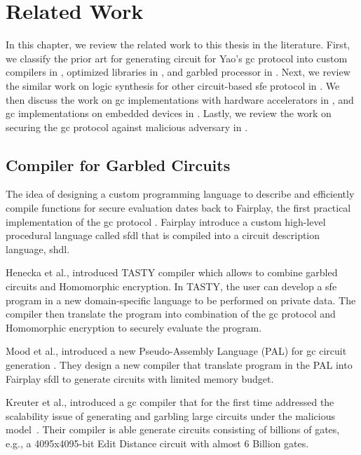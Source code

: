 \chapter{Related Work}\label{chap:related}
In this chapter, we review the related work to this thesis in the literature.
First, we classify the prior art for generating circuit for Yao's \acrfull{gc} protocol into custom compilers in , optimized libraries in , and garbled processor in .
Next, we review the similar work on logic synthesis for other circuit-based \acrshort{sfe} protocol in .
We then discuss the work on \acrshort{gc} implementations with hardware accelerators in , and \acrshort{gc} implementations on embedded devices in .
Lastly, we review the work on securing the \acrshort{gc} protocol against malicious adversary in .

\section{Compiler for Garbled Circuits}\label{sec:related-compiler}
The idea of designing a custom programming language to describe and efficiently compile functions for secure evaluation dates back to Fairplay, the first practical implementation of the \acrshort{gc} protocol \cite{malkhi2004fairplay}.
Fairplay introduce a custom high-level procedural language called \acrfull{sfdl} that is compiled into a circuit description language, \acrfull{shdl}.

Henecka et al., introduced TASTY compiler \cite{henecka2010tasty} which allows to combine garbled circuits and Homomorphic encryption.
In TASTY, the user can develop a \acrshort{sfe} program in a new domain-specific language to be performed on private data.
The compiler then translate the program into combination of the \acrshort{gc} protocol and Homomorphic encryption to securely evaluate the program.

Mood et al., introduced a new Pseudo-Assembly Language (PAL) for \acrshort{gc} circuit generation \cite{mood2012memory}.
They design a new compiler that translate program in the PAL into Fairplay \acrshort{sfdl} to generate circuits with limited memory budget.

Kreuter et al., introduced a \acrshort{gc} compiler that for the first time addressed the scalability issue of generating and garbling large circuits under the malicious model~\cite{kreuter2012billion}.
Their compiler is able generate circuits consisting of billions of gates, e.g., a 4095x4095-bit Edit Distance circuit with almost 6 Billion gates.

